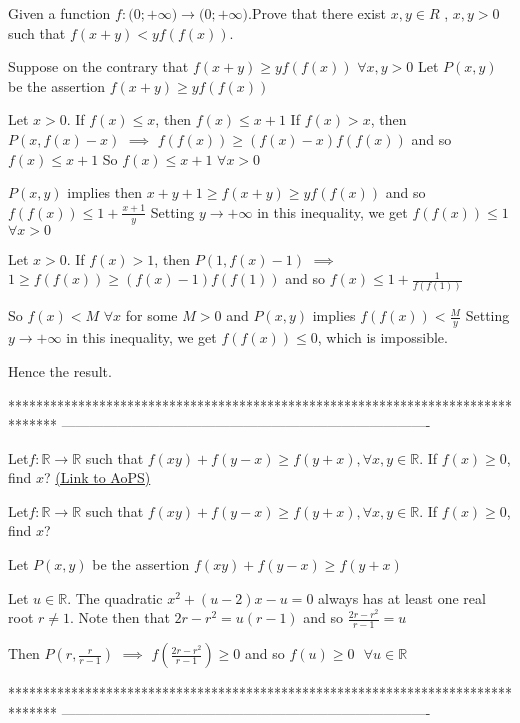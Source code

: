 \begin{solution}
	\begin{tcolorbox}Given a function ${{f: \mathbb(0;+\infty)}\to\mathbb(0;+\infty)}$.Prove that there exist $x,y{\in}R$ , $x,y>0$ such that $f(x+y)<yf(f(x))$.\end{tcolorbox}
Suppose on the contrary that $f(x+y)\ge yf(f(x))$ $\forall x,y>0$
Let $P(x,y)$ be the assertion  $f(x+y)\ge yf(f(x))$

Let $x>0$.
If $f(x)\le x$, then $f(x)\le x+1$
If $f(x)>x$, then $P(x,f(x)-x)$ $\implies$ $f(f(x))\ge (f(x)-x)f(f(x))$ and so $f(x)\le x+1$
So $f(x)\le x+1$ $\forall x>0$

$P(x,y)$ implies then $x+y+1\ge f(x+y)\ge yf(f(x))$ and so $f(f(x))\le 1+\frac{x+1}y$
Setting $y\to+\infty$ in this inequality, we get $f(f(x))\le 1$ $\forall x>0$

Let $x>0$. If $f(x)>1$, then $P(1,f(x)-1)$ $\implies$ $1\ge f(f(x))\ge (f(x)-1)f(f(1))$ and so $f(x)\le 1+\frac 1{f(f(1))}$

So $f(x)<M$ $\forall x$ for some $M>0$ and $P(x,y)$ implies $f(f(x))<\frac My$
Setting $y\to +\infty$ in this inequality, we get $f(f(x))\le 0$, which is impossible.

Hence the result.
\end{solution}
*******************************************************************************
-------------------------------------------------------------------------------

\begin{problem}
	Let$ f:\mathbb{R}\to\mathbb{R}$ such that $f(xy)+f(y-x) \ge f(y+x) ,\forall x,y\in\mathbb{R}$.
If $f(x) \ge 0 $, find $x$?
	\flushright \href{https://artofproblemsolving.com/community/c6h559010}{(Link to AoPS)}
\end{problem}



\begin{solution}
	\begin{tcolorbox}Let$ f:\mathbb{R}\to\mathbb{R}$ such that $f(xy)+f(y-x) \ge f(y+x) ,\forall x,y\in\mathbb{R}$.
If $f(x) \ge 0 $, find $x$?\end{tcolorbox}
Let $P(x,y)$ be the assertion $f(xy)+f(y-x)\ge f(y+x)$

Let $u\in\mathbb R$. The quadratic $x^2+(u-2)x-u=0$ always has at least one real root $r\ne 1$.
Note then that $2r-r^2=u(r-1)$ and so $\frac{2r-r^2}{r-1}=u$

Then $P(r,\frac r{r-1})$ $\implies$ $f(\frac{2r-r^2}{r-1})\ge 0$ and so $\boxed{f(u)\ge 0\text{    }\forall u\in\mathbb R}$
\end{solution}
*******************************************************************************
-------------------------------------------------------------------------------

